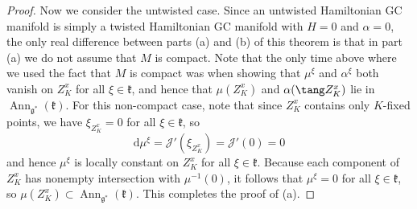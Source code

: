 \begin{proof}
Now we consider the untwisted case.
Since an untwisted Hamiltonian GC manifold is simply a twisted Hamiltonian GC manifold with $H=0$ and $\alpha = 0$, the only real dif\/ference between parts (a) and (b) of this theorem is that in part (a) we do not assume that $M$ is compact.
Note that the only time above where we used the fact that $M$ is compact was when showing that $\mu^{\xi}$ and $\alpha^{\xi}$ both vanish on $Z_K^x$ for all $\xi \in \mathfrak{k}$, and hence that $\mu(Z_K^x)$ and $\alpha( \tang Z_K^x)$ lie in $\operatorname{Ann}_{\mathfrak{g}^*} (\mathfrak{k})$.
For this non-compact case, note that since $Z_K^x$ contains only $K$-f\/ixed points, we have $\xi_{Z_K^x} = 0$ for all $\xi \in \mathfrak{k}$, so
\[
  \mathrm{d} \mu^{\xi} = \mathcal{J}'(\xi_{Z_K^x})
  = \mathcal{J}'(0) = 0
\]
and hence $\mu^{\xi}$ is locally constant on $Z_K^x$ for all $\xi \in \mathfrak{k}$.
Because each component of $Z_K^x$ has nonempty intersection with $\mu^{-1}(0)$, it follows that $\mu^{\xi} = 0$ for all $\xi \in \mathfrak{k}$, so $\mu(Z_K^x) \subset \operatorname{Ann}_{\mathfrak{g}^*} (\mathfrak{k})$.
This completes the proof of (a).
\end{proof}
